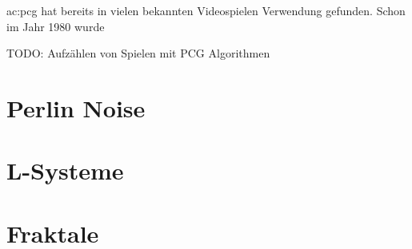 \gls{ac:pcg} hat bereits in vielen bekannten Videospielen Verwendung gefunden. Schon im Jahr 1980 wurde %

TODO: Aufzählen von Spielen mit PCG Algorithmen

\section{Perlin Noise}
\cite{16_perlin}

\section{L-Systeme}

\section{Fraktale}
\cite{18_mandelbrot_frame}
